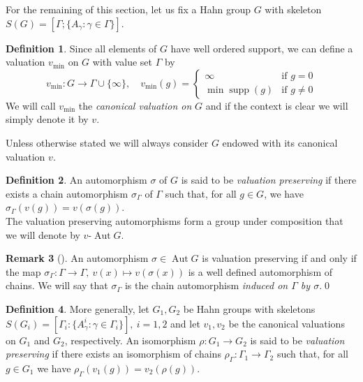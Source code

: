 \documentclass[12pt,a4paper,reqno,openright]{amsart}
\newcommand{\ra}{\rightarrow}
\renewcommand{\1}{\mathbbm{1}}
\DeclareMathOperator{\Aut}{Aut}
\newcommand{\vAut}{v\text{-}\Aut}
\DeclareMathOperator*\supp{supp}
\theoremstyle{definition}
\newtheorem{defn}{Definition}[section]
\theoremstyle{plain}
\theoremstyle{plain}
\theoremstyle{plain}
\theoremstyle{plain}
\theoremstyle{plain}
\theoremstyle{plain}
\theoremstyle{plain}
\theoremstyle{plain}
\theoremstyle{definition}
\theoremstyle{definition}
\theoremstyle{plain}
\theoremstyle{definition}
\theoremstyle{definition}
\newtheorem{rmk}[defn]{Remark}
\theoremstyle{plain}
\theoremstyle{plain}
\theoremstyle{plain}
\begin{document}
For the remaining of this section, let us fix a Hahn group $ G $ with skeleton $ S(G) = [\Gamma;\{A_\gamma:\gamma\in\Gamma\}] $.

\begin{defn}\label{def:valuation-and-ordering}
	Since all elements of $G$ have well ordered support, we can define a valuation $ v_{\min} $ on $ G $ with value set $ \Gamma $ by
	\[
	v_{\min}\colon G \longrightarrow \Gamma\cup\{\infty\},\quad  v_{\min}(g) = \begin{cases}
	\infty &\text{if } g=0	\\
	\min\supp(g) &\text{if } g\neq 0
	\end{cases}
	\]
	We will call $ v_{\min} $ the \emph{canonical valuation on} $ G $ and if the context is clear we will simply denote it by $ v $.
\end{defn}
Unless otherwise stated we will always consider $ G $ endowed with its canonical valuation $ v $.

\begin{defn}\label{def:val-pres}
	An automorphism $ \sigma $ of $ G $ is said to be \emph{valuation preserving} if there exists a chain automorphism $ \sigma_{\Gamma} $ of $ \Gamma $ such that, for all $ g\in G $, we have $ \sigma_{\Gamma}(v(g)) = v(\sigma(g)) $.\\
	The valuation preserving automorphisms form a group under composition that we will denote by $ \vAut G $.
\end{defn}
\begin{rmk}[{\cite[Lemma~0.1]{salma-monograph}}]
	\label{rmk:induced-autom}
	An automorphism $ \sigma\in\Aut G $ is valuation preserving if and only if the map $ \sigma_\Gamma\colon\Gamma\ra\Gamma,\ v(x)\mapsto v(\sigma(x)) $
	is a well defined automorphism of chains. We will say that $ \sigma_{\Gamma} $ is the chain automorphism \emph{induced on $ \Gamma $ by $ \sigma $}.\qed
\end{rmk}
\begin{defn}\label{def:val-pres-iso}
	More generally, let $ G_1,G_2 $ be Hahn groups with skeletons $ S(G_i) = [\Gamma_i:\{ A^i_\gamma : \gamma\in\Gamma_i \}],\ i=1,2 $ and let $ v_1,v_2 $ be the canonical valuations on $ G_1 $ and $ G_2 $, respectively. An isomorphism $ \rho\colon G_1\to G_2 $ is said to be \emph{valuation preserving} if there exists an isomorphism of chains $ \rho_\Gamma\colon\Gamma_1\to\Gamma_2 $ such that, for all $ g\in G_1 $ we have $ \rho_\Gamma(v_1(g)) = v_2(\rho(g)) $.
\end{defn}
\end{document}
